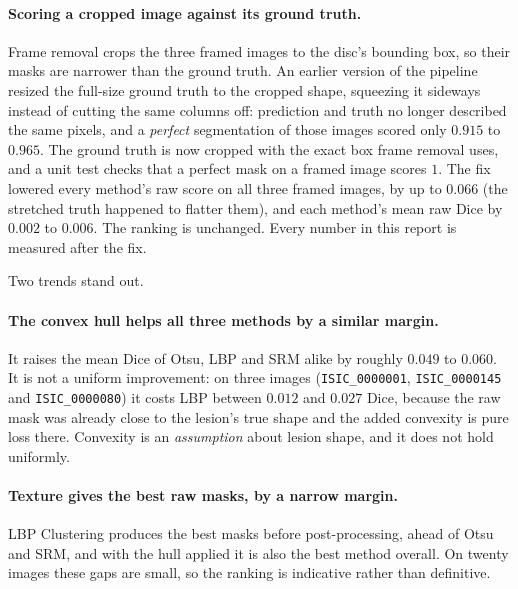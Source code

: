 \documentclass[11pt,a4paper]{article}
\begin{document}
\paragraph{Scoring a cropped image against its ground truth.} Frame removal
crops the three framed images to the disc's bounding box, so their masks are
narrower than the ground truth. An earlier version of the pipeline resized the
full-size ground truth to the cropped shape, squeezing it sideways instead of
cutting the same columns off: prediction and truth no longer described the
same pixels, and a \emph{perfect} segmentation of those images scored only
$0.915$ to $0.965$. The ground truth is now cropped with the exact box frame
removal uses, and a unit test checks that a perfect mask on a framed image
scores $1$. The fix lowered every method's raw score on all three framed
images, by up to $0.066$ (the stretched truth happened to flatter them), and
each method's mean raw Dice by $0.002$ to $0.006$. The ranking is unchanged.
Every number in this report is measured after the fix.

\begin{table}[H]
  \centering
  \overalltable
  \caption{Mean Dice coefficient per method.}
  \label{tab:overall}
\end{table}

Two trends stand out.

\paragraph{The convex hull helps all three methods by a similar margin.} It
raises the mean Dice of Otsu, LBP and SRM alike by roughly $0.049$ to
$0.060$. It is not a uniform improvement: on three images
(\texttt{ISIC\_0000001}, \texttt{ISIC\_0000145} and \texttt{ISIC\_0000080}) it
costs LBP between $0.012$ and $0.027$ Dice, because the raw mask was already
close to the lesion's true shape and the added convexity is pure loss there.
Convexity is an \emph{assumption} about lesion shape, and it does not hold
uniformly.

\paragraph{Texture gives the best raw masks, by a narrow margin.} LBP
Clustering produces the best masks before post-processing, ahead of Otsu and
SRM, and with the hull applied it is also the best method overall. On twenty
images these gaps are small, so the ranking is indicative rather than
definitive.
\end{document}
